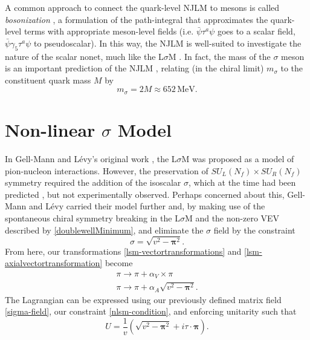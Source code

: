 \documentclass[aps,prd,onecolumn,showpacs,amsmath,amssymb,nofootinbib]{revtex4} \pdfoutput=1
\newcommand{\lsm}{L$\sigma$M}
\newcommand{\mev}{\mathrm{MeV}}
\begin{document}
A common approach to connect the quark-level NJLM to mesons is called \textit{bosonization} \cite{Ebert1998}, a formulation of the path-integral that approximates the quark-level terms with appropriate meson-level fields (i.e. $\bar{\psi}\tau^{a}\psi$ goes to a scalar field, $\bar{\psi}\gamma_{5}\tau^{a}\psi$ to pseudoscalar). In this way, the NJLM is well-suited to investigate the nature of the scalar nonet, much like the {\lsm} \cite{Hatsuda1994,BIJNENS1996370,Delbourgo1995}. In fact, the mass of the $\sigma$ meson is an important prediction of the NJLM \cite{Schumacher2014}, relating (in the chiral limit) $m_\sigma$ to the constituent quark mass $M$ by
\begin{equation}
    \label{sigma-mass}
    m_\sigma = 2M \approx 652\,\mev.
\end{equation}

\section{Non-linear $\sigma$ Model}\label{IV}
In Gell-Mann and L\'evy's original work \cite{GellMann1960}, the {\lsm} was proposed as a model of pion-nucleon interactions. However, the preservation of ${S\!U}_L(N_f)\times {S\!U}_R(N_f)$ symmetry required the addition of the isoscalar $\sigma$, which at the time had been predicted \cite{Schwinger1957}, but not experimentally observed. Perhaps concerned about this, Gell-Mann and L\'evy carried their model further and, by making use of the spontaneous chiral symmetry breaking in the {\lsm} and the non-zero VEV described by \eqref{doublewellMinimum}, and eliminate the $\sigma$ field by the constraint
\begin{equation}
    \label{nlsm-condition}
    \sigma = \sqrt{v^2 - \mathbf{\pi}^2}.
\end{equation}
From here, our transformations \eqref{lsm-vectortransformations} and \eqref{lsm-axialvectortransformation} become
\begin{gather}
    \pi   \rightarrow \pi + \alpha_V \times \pi \label{nlsm-vector}\\
    \pi   \rightarrow \pi + \alpha_A \sqrt{v^2 - \mathbf{\pi}^2}\label{nlsm-axial}.
\end{gather}
The Lagrangian can be expressed using our previously defined matrix field \eqref{sigma-field}, our constraint \eqref{nlsm-condition}, and enforcing unitarity such that
\begin{equation}
    \label{nlsm-matrix-field}
    U = \frac{1}{v}\left( \sqrt{v^2 - \mathbf{\pi}^2} + i \tau \cdot \mathbf{\pi}\right).
\end{equation}
\end{document}
